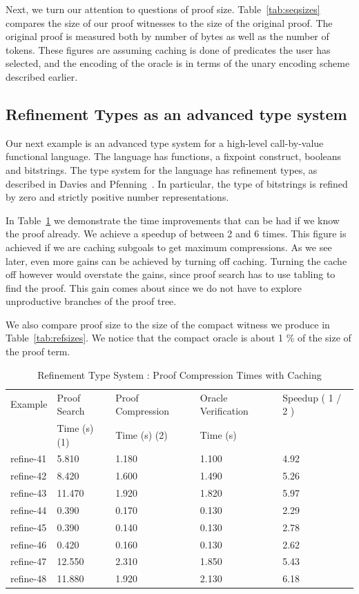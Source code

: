 \documentclass{acmconf}
\begin{document}
Next, we turn our attention to questions of proof size. 
Table~\ref{tab:seqsizes} compares the size of our proof witnesses to the
size of the original proof. The original proof is measured both by number 
of bytes as well as the number of tokens. These figures are assuming 
caching is done of predicates the user has selected, and the encoding of
the oracle is in terms of the unary encoding scheme described earlier.

\subsection{Refinement Types as an advanced type system}
Our next example is an advanced type system for a high-level
call-by-value functional language. The language has functions, a
fixpoint construct, booleans and bitstrings. The type system for the
language has refinement types, as described in Davies and
Pfenning~\cite{davies+:intersection}. In particular, the type of
bitstrings is refined by zero and strictly positive number
representations.

In Table~\ref{tab:reftimes} we demonstrate the time improvements that
can be had if we know the proof already. We achieve a speedup of
between 2 and 6 times. This figure is achieved if we are caching
subgoals to get maximum compressions. As we see later, even more gains
can be achieved by turning off caching. Turning the cache off however
would overstate the gains, since proof search has to use tabling to
find the proof. This gain comes about since we do not have to explore 
unproductive branches of the proof tree.

We also compare proof size to the size of the compact witness we
produce in Table~\ref{tab:refsizes}. We notice that the compact oracle
is about 1 \% of the size of the proof term.

\begin{table}[htbp]
\begin{center}
\begin{small}
\begin{tabular}{|l|l|l|l|l|}
\hline
Example & Proof Search & Proof Compression 
& Oracle Verification & Speedup ( 1 / 2 )\\
& Time (s) (1) & Time (s) (2) & Time (s) & \\
\hline
refine-41 & 5.810 & 1.180 & 1.100 & 4.92 \\
refine-42 & 8.420 & 1.600 & 1.490 & 5.26 \\
refine-43 & 11.470 & 1.920 & 1.820 & 5.97 \\
refine-44 & 0.390 & 0.170 & 0.130 & 2.29 \\
refine-45 & 0.390 & 0.140 & 0.130 & 2.78 \\
refine-46 & 0.420 & 0.160 & 0.130 & 2.62 \\
refine-47 & 12.550 & 2.310 & 1.850 & 5.43 \\
refine-48 & 11.880 & 1.920 & 2.130 & 6.18 \\
\hline
\end{tabular}
\end{small}
\end{center}
\caption{\label{tab:reftimes} Refinement Type System : 
Proof Compression Times with Caching}
\end{table}
\end{document}
